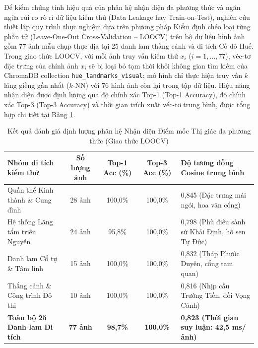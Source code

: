 Để kiểm chứng tính hiệu quả của phân hệ nhận diện đa phương thức và ngăn ngừa rủi ro rò rỉ dữ liệu kiểm thử (Data Leakage hay Train-on-Test), nghiên cứu thiết lập quy trình thực nghiệm dựa trên phương pháp Kiểm định chéo loại từng phần tử (Leave-One-Out Cross-Validation -- LOOCV) trên bộ dữ liệu hình ảnh gồm 77 ảnh mẫu chụp thực địa tại 25 danh lam thắng cảnh và di tích Cố đô Huế. Trong giao thức LOOCV, với mỗi ảnh truy vấn kiểm thử $x_i$ ($i = 1, \dots, 77$), véc-tơ đặc trưng của chính ảnh $x_i$ sẽ bị loại bỏ tạm thời khỏi không gian tìm kiếm của ChromaDB collection \texttt{hue\_landmarks\_visual}; mô hình chỉ thực hiện truy vấn $k$ láng giềng gần nhất ($k$-NN) với 76 hình ảnh còn lại trong tập dữ liệu. Hiệu năng nhận diện được định lượng qua độ chính xác Top-1 (Top-1 Accuracy), độ chính xác Top-3 (Top-3 Accuracy) và thời gian trích xuất véc-tơ trung bình, được tổng hợp chi tiết tại Bảng \ref{tab:visual-benchmark-results}.

\begin{table}[htbp]
\centering
\caption{Kết quả đánh giá định lượng phân hệ Nhận diện Điểm mốc Thị giác đa phương thức (Giao thức LOOCV)}
\label{tab:visual-benchmark-results}
\footnotesize
\singlespacing
\renewcommand{\arraystretch}{1.0}
\begin{tabularx}{\textwidth}{l c c c X}
\hline
\textbf{Nhóm di tích kiểm thử} & \textbf{Số lượng ảnh} & \textbf{Top-1 Acc (\%)} & \textbf{Top-3 Acc (\%)} & \textbf{Độ tương đồng Cosine trung bình} \\
\hline
Quần thể Kinh thành \& Cung đình & 28 ảnh & 100,0\% & 100,0\% & 0,845 (Đặc trưng mái ngói, hoa văn cổng) \\
Hệ thống Lăng tẩm triều Nguyễn & 24 ảnh & 95,8\% & 100,0\% & 0,798 (Phù điêu sành sứ Khải Định, hồ sen Tự Đức) \\
Danh lam Cổ tự \& Tâm linh & 15 ảnh & 100,0\% & 100,0\% & 0,832 (Tháp Phước Duyên, cổng tam quan) \\
Thắng cảnh \& Công trình Đô thị & 10 ảnh & 100,0\% & 100,0\% & 0,816 (Nhịp cầu Trường Tiền, đồi Vọng Cảnh) \\
\hline
\textbf{Toàn bộ 25 Danh lam Di tích} & \textbf{77 ảnh} & \textbf{98,7\%} & \textbf{100,0\%} & \textbf{0,823 (Thời gian suy luận: 42,5 ms/ảnh)} \\
\hline
\end{tabularx}
\end{table}


